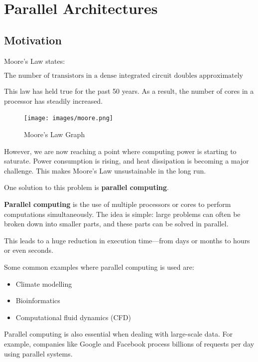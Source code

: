 \documentclass[12pt]{book}
\begin{document}
\chapter{Parallel Architectures}

\section{Motivation}

Moore's Law states:

\begin{equation}
    \text{The number of transistors in a dense integrated circuit doubles approximately every two years.}
\end{equation}

This law has held true for the past 50 years. As a result, the number of cores in a processor has steadily increased.

\begin{figure}[H]
    \centering
    \texttt{[image: images/moore.png]}
    \caption{Moore's Law Graph}
\end{figure} 

However, we are now reaching a point where computing power is starting to saturate. Power consumption is rising, and heat dissipation is becoming a major challenge. This makes Moore's Law unsustainable in the long run.

One solution to this problem is \textbf{parallel computing}.

\vspace{0.3cm}

\textbf{Parallel computing} is the use of multiple processors or cores to perform computations simultaneously. The idea is simple: large problems can often be broken down into smaller parts, and these parts can be solved in parallel.

This leads to a huge reduction in execution time—from days or months to hours or even seconds. 

Some common examples where parallel computing is used are:
\begin{itemize}
    \item Climate modelling
    \item Bioinformatics
    \item Computational fluid dynamics (CFD)
\end{itemize}

Parallel computing is also essential when dealing with large-scale data. For example, companies like Google and Facebook process billions of requests per day using parallel systems.
\end{document}
